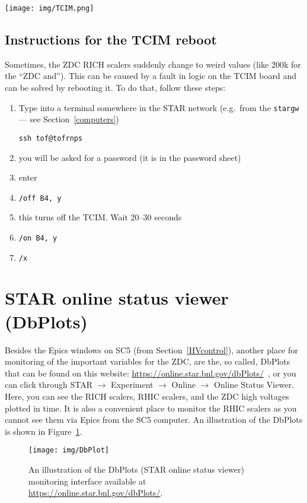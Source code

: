 \begin{sidewaysfigure}
\begin{center}
\texttt{[image: img/TCIM.png]}
\end{center}
\caption{TCIM web control, accessible at \url{172.16.15.101/AnalogandCoincidenceLogic13.html} in Firefox at \texttt{startrg.starp.bnl.gov}.}
\label{tcimweb}
\end{sidewaysfigure}


\subsection{Instructions for the TCIM reboot}
Sometimes, the ZDC RICH scalers suddenly change to weird values (like 200k for the ``ZDC and''). This can be caused by a fault in logic on the TCIM board and can be solved by rebooting it.
To do that, follow these steps:


\begin{enumerate}
\item Type into a terminal somewhere in the STAR network (e.g.\ from the \texttt{stargw} --- see Section~\ref{computers})
\begin{verbatim}
ssh tof@tofrnps
\end{verbatim}
\item you will be asked for a password (it is in the password sheet)
\item enter
\item \verb=/off B4, y=
\item this turns off the TCIM\@. Wait 20--30 seconds
\item \verb=/on B4, y=
\item \verb=/x=
\end{enumerate}

\section{STAR online status viewer (DbPlots)}
Besides the Epics windows on SC5 (from Section~\ref{HVcontrol}), another place for monitoring of the  important variables for the ZDC, are the, so called, DbPlots that can be found on this website: \url{https://online.star.bnl.gov/dbPlots/}~\cite{DbPlots}, or you can click through STAR $\rightarrow$ Experiment $\rightarrow$ Online $\rightarrow$  Online Status Viewer. Here, you can see the RICH scalers, RHIC scalers, and the ZDC high voltages plotted in time. It is also a convenient place to monitor the RHIC scalers as you cannot see them via Epics from the SC5 computer. An illustration of the DbPlots is shown in Figure~\ref{dbPlots}.

\begin{figure}[htb]
\begin{center}
\texttt{[image: img/DbPlot]}
\end{center}
\caption{An illustration of the DbPlots (STAR online status viewer) monitoring interface available at \url{https://online.star.bnl.gov/dbPlots/}.}
\label{dbPlots}
\end{figure}